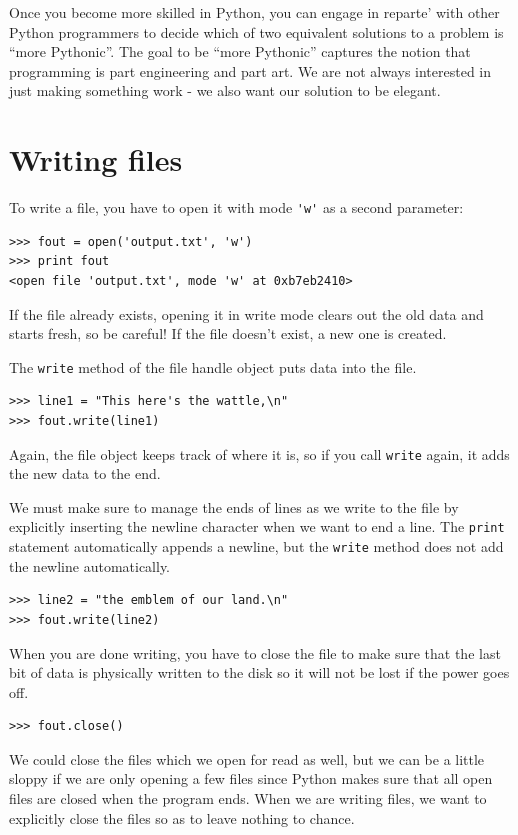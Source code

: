 \documentclass[10pt]{book}
\begin{document}
Once you become more skilled in Python, you can engage
in reparte' with other Python programmers to decide
which of two equivalent solutions to a problem is 
``more Pythonic''.  The goal to be ``more Pythonic'' 
captures the notion that programming is part engineering
and part art.  We are not always interested
in just making something work - we also want
our solution to be elegant.


\section{Writing files}


To write a file, you have to open it with mode
\verb"'w'" as a second parameter:

\beforeverb
\begin{verbatim}
>>> fout = open('output.txt', 'w')
>>> print fout
<open file 'output.txt', mode 'w' at 0xb7eb2410>
\end{verbatim}
\afterverb
%
If the file already exists, opening it in write mode clears out
the old data and starts fresh, so be careful!
If the file doesn't exist, a new one is created.

The {\tt write} method of the file handle object 
puts data into the file.

\beforeverb
\begin{verbatim}
>>> line1 = "This here's the wattle,\n"
>>> fout.write(line1)
\end{verbatim}
\afterverb
%
Again, the file object keeps track of where it is, so if
you call {\tt write} again, it adds the new data to the end.

We must make sure to manage the ends of lines as we write
to the file by explicitly inserting the newline character
when we want to end a line.  The {\tt print} statement 
automatically appends a newline, but the {\tt write} 
method does not add the newline automatically.

\beforeverb
\begin{verbatim}
>>> line2 = "the emblem of our land.\n"
>>> fout.write(line2)
\end{verbatim}
\afterverb
%
When you are done writing, you have to close the file
to make sure that the last bit of data is physically written
to the disk so it will not be lost if the power goes off.

\beforeverb
\begin{verbatim}
>>> fout.close()
\end{verbatim}
\afterverb
%
We could close the files which we open for read as well, 
but we can be a little sloppy if we are only opening a few
files since Python makes sure that all open files are 
closed when the program ends.  When we are writing files, 
we want to explicitly close the files so as to leave nothing
to chance.
\end{document}
